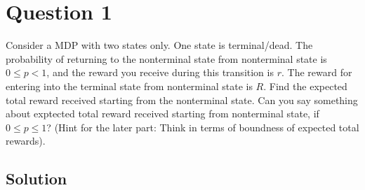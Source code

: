 \section*{Question 1}

Consider a MDP with two states only.
One state is terminal/dead.
The probability of returning to the nonterminal state from nonterminal state is \( 0 \leq p<1 \), and the reward you receive during this transition is \( r \).
The reward for entering into the terminal state from nonterminal state is \( R \).
Find the expected total reward received starting from the nonterminal state.
Can you say something about exptected total reward received starting from nonterminal state, if \( 0 \leq p \leq 1 \)?
(Hint for the later part: Think in terms of boundness of expected total rewards).

\subsection*{Solution}
